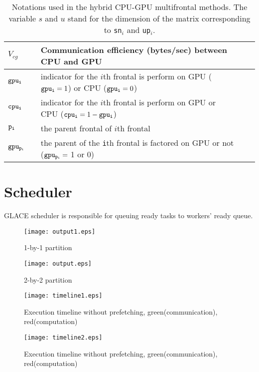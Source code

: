 \documentclass[preprint,11pt]{elsarticle}
\begin{document}
\begin{table}
{\begin{tabular}{lllll}
    {\tt $V_{cg}$} && Communication efficiency (bytes/sec) between CPU and GPU \\ \hline

    ${\tt gpu_i}$ && indicator for the $i$th frontal is perform on GPU
(${\tt gpu_i}=1$) or CPU (${\tt gpu_i}=0$)\\
    ${\tt cpu_i}$ && indicator for the $i$th frontal is perform on GPU or CPU (${\tt cpu_i}=1-{\tt gpu_i}$)\\
    ${\tt p_i}$ && the parent frontal of $i$th frontal\\
    ${\tt gpu_{p_i}}$ &&  the parent of the {\tt i}th frontal is factored on GPU or not (${\tt gpu_{p_i}}=$ 1 or 0)\\
    \hline
  \end{tabular}
}
\caption{Notations used in the hybrid CPU-GPU multifrontal methods.
  The variable $s$ and $u$ stand for the dimension of the matrix corresponding 
  to {\tt sn$_i$} and {\tt up$_i$}.}
  \label{tab:notation}
\end{table}

\section{Scheduler}
  GLACE scheduler is responsible for queuing ready tasks to workers' ready queue. 

\begin{figure}
  \centering
  \texttt{[image: output1.eps]} 
  \caption{1-by-1 partition}
  \label{fig:dep1}
\end{figure}
\begin{figure}
  \centering
  \texttt{[image: output.eps]} 
  \caption{2-by-2 partition}
  \label{fig:dep2}
\end{figure}

\begin{figure}
\begin{minipage} [t] {0.5\textwidth}
  \texttt{[image: timeline1.eps]} 
  \caption{Execution timeline without prefetching, green(communication), red(computation)}
  \label{fig:timeline1}
\end{minipage}
\begin{minipage} [t] {0.5\textwidth}
  \texttt{[image: timeline2.eps]} 
  \caption{Execution timeline without prefetching, green(communication), red(computation)}
  \label{fig:timeline2}
\end{minipage}
\end{figure}
\end{document}
